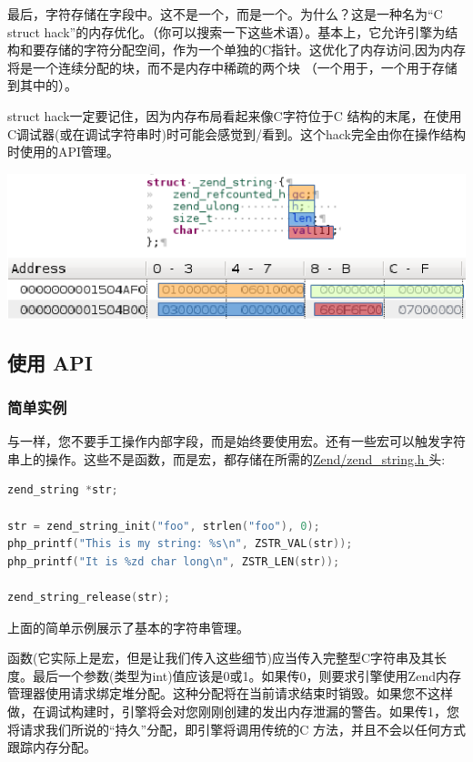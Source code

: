 最后，字符存储在字段中。这不是一个，而是一个。为什么？这是一种名为“C struct hack”的内存优化。（你可以搜索一下这些术语）。基本上，它允许引擎为结构和要存储的字符分配空间，作为一个单独的C指针。这优化了内存访问,因为内存将是一个连续分配的块，而不是内存中稀疏的两个块
（一个用于，一个用于存储到其中的）。

struct hack一定要记住，因为内存布局看起来像C字符位于C 结构的末尾，在使用C调试器(或在调试字符串时)时可能会感觉到/看到。这个hack完全由你在操作结构时使用的API管理。

\includegraphics{images/zend_string_memory_layout.png} 

\subsection{使用 API}

\subsubsection{简单实例}

与一样，您不要手工操作内部字段，而是始终要使用宏。还有一些宏可以触发字符串上的操作。这些不是函数，而是宏，都存储在所需的\href{https://github.com/php/php-src/blob/PHP-7.0/Zend/zend_string.h}{Zend/zend\_string.h }头:

\begin{lstlisting}[language=c]
zend_string *str;

str = zend_string_init("foo", strlen("foo"), 0);
php_printf("This is my string: %s\n", ZSTR_VAL(str));
php_printf("It is %zd char long\n", ZSTR_LEN(str));

zend_string_release(str);
\end{lstlisting}

上面的简单示例展示了基本的字符串管理。

函数(它实际上是宏，但是让我们传入这些细节)应当传入完整型C字符串及其长度。最后一个参数(类型为int)值应该是0或1。如果传0，则要求引擎使用Zend内存管理器使用请求绑定堆分配。这种分配将在当前请求结束时销毁。如果您不这样做，在调试构建时，引擎将会对您刚刚创建的发出内存泄漏的警告。如果传1，您将请求我们所说的“持久”分配，即引擎将调用传统的C 方法，并且不会以任何方式跟踪内存分配。

